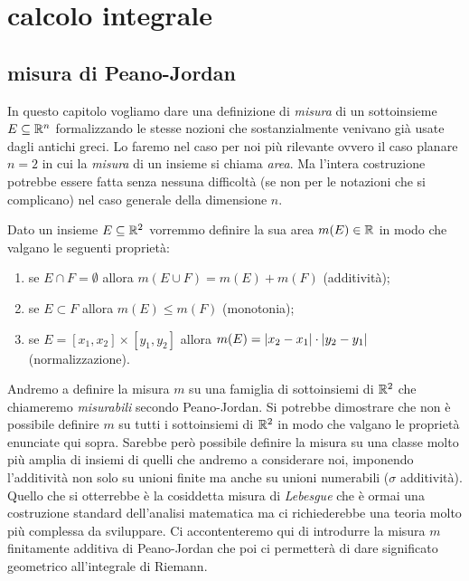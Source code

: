 \chapter{calcolo integrale}


\section{misura di Peano-Jordan}

In questo capitolo vogliamo dare una definizione di \emph{misura} di un
sottoinsieme $E\subseteq \mathbb R^n$ formalizzando le stesse nozioni che sostanzialmente
venivano già usate dagli antichi greci.
Lo faremo nel caso per noi più rilevante ovvero il caso planare $n=2$ in cui la \emph{misura}
di un insieme si chiama \emph{area}.
Ma l'intera costruzione potrebbe essere fatta senza
nessuna difficoltà (se non per le notazioni che si complicano) nel caso generale della
dimensione $n$.

Dato un insieme $E\subseteq \mathbb R^2$ vorremmo definire la sua area $m(E)\in \mathbb R$
in modo che valgano le seguenti proprietà:
\begin{enumerate}
  \item se $E\cap F=\emptyset$ allora $m(E\cup F) = m(E) + m(F)$ (additività);
  \item se $E \subset F$ allora $m(E) \le m(F)$ (monotonia);
  \item se $E=[x_1,x_2]\times [y_1,y_2]$
  allora $m(E) = {\left|x_2-x_1\right|}\cdot {\left|y_2-y_1\right|}$ (normalizzazione).
\end{enumerate}

Andremo a definire la misura $m$ su una famiglia di sottoinsiemi di $\mathbb R^2$ che
chiameremo \emph{misurabili} secondo Peano-Jordan.
Si potrebbe dimostrare che non è possibile definire $m$ su tutti i sottoinsiemi di $\mathbb R^2$
in modo che valgano le proprietà enunciate qui sopra.
Sarebbe però possibile
definire la misura su una classe molto più amplia di insiemi di quelli che andremo a considerare noi, imponendo
l'additività non solo su unioni finite ma anche su unioni numerabili
($\sigma$ additività).
Quello che si otterrebbe
è la cosiddetta misura di \emph{Lebesgue} che è ormai una costruzione standard
dell'analisi matematica ma ci richiederebbe una teoria molto più complessa da sviluppare.
Ci accontenteremo qui di introdurre la misura $m$ finitamente additiva di Peano-Jordan
che poi ci permetterà di dare significato geometrico all'integrale di Riemann.

